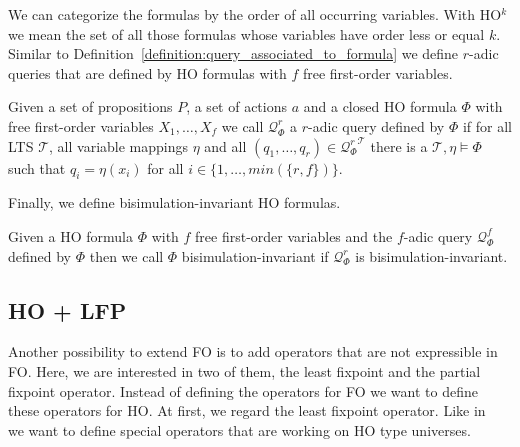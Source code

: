 We can categorize the formulas by the order of all occurring variables. With HO$^k$ we mean 
the set of all those formulas whose variables have order less or equal $k$.
Similar to Definition~\ref{definition:query_associated_to_formula} we define $r$-adic queries that are defined by HO formulas with $f$ free first-order variables. 

\begin{definition}
\label{definition:query_associated_to_formula_ho}
    Given a set of propositions $P$, a set of actions $a$ and a closed HO
    formula $\Phi$ with free first-order variables $X_1, \dots, X_f$ we call $\mathcal{Q}^r_\Phi$ a $r$-adic query defined by $\Phi$ if for all LTS $\mathcal{T}$, all variable mappings $\eta$ and all $(q_1, \dots, q_r) \in {\mathcal{Q}^r_\Phi}^\mathcal{T}$ there is a $\mathcal{T}, \eta \models
     \Phi$ such that $q_i = \eta(x_i)$ for all $i \in
    \{1, \dots, min(\{r, f\})\}$.
\end{definition}

Finally, we define bisimulation-invariant HO formulas.

\begin{definition} 
\label{definition:bisimulation_invariant_ho_formula}
	Given a HO formula $\Phi$ with $f$ free first-order variables and the $f$-adic query $\mathcal{Q}^f_\Phi$ defined by $\Phi$ then we call $\Phi$ bisimulation-invariant if $\mathcal{Q}^r_\Phi$ is bisimulation-invariant.
\end{definition}

\subsection{HO + LFP}
\label{subsec:hoPlusLfp}

Another possibility to extend FO is to add operators that are not expressible in FO. Here, we are interested in two
of them, the least fixpoint and the partial fixpoint operator. Instead of defining the operators for FO we want
to define these operators for HO. At first, we regard the least fixpoint operator.
Like in~\cite{freireMartins2011descriptive} we want to define special operators that are working on HO type universes.

